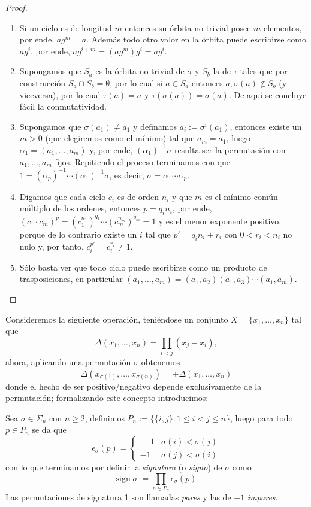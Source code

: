\documentclass[11pt,oneside]{book}
\DeclareMathOperator{\sign}{sign}
\begin{document}
\begin{proof}
	\begin{enumerate}
	\item Si un ciclo es de longitud $m$ entonces su órbita no-trivial posee $m$ elementos, por ende, $ag^m=a$. Además todo otro valor en la órbita puede escribirse como $ag^i$, por ende, $ag^{i+m}=(ag^m)g^i=ag^i$.
	\item Supongamos que $S_a$ es la órbita no trivial de $\sigma$ y $S_b$ la de $\tau$ tales que por construcción $S_a\cap S_b=\emptyset$, por lo cual si $a\in S_a$ entonces $a,\sigma(a)\notin S_b$ (y viceversa), por lo cual $\tau(a)=a$ y $\tau(\sigma(a))=\sigma(a)$. De aquí se concluye fácil la conmutatividad.
	\item Supongamos que $\sigma(a_1)\neq a_1$ y definamos $a_i:=\sigma^i(a_1)$, entonces existe un $m\gt 0$ (que elegiremos como el mínimo) tal que $a_m=a_1$, luego $\alpha_1=(a_1,\dots,a_m)$ y, por ende, $(\alpha_1)^{-1}\sigma$ resulta ser la permutación con $a_1,\dots,a_m$ fijos. Repitiendo el proceso terminamos con que $1=(\alpha_p)^{-1}\cdots(\alpha_1)^{-1}\sigma$, es decir, $\sigma=\alpha_1\cdots\alpha_p$.
	\item Digamos que cada ciclo $c_i$ es de orden $n_i$ y que $m$ es el mínimo común múltiplo de los ordenes, entonces $p=q_in_i$, por ende, $(c_1\cdot c_m)^p=(c_1^{n_1})^{q_1}\cdots(c_m^{n_m})^{q_m}=1$ y es el menor exponente positivo, porque de lo contrario existe un $i$ tal que $p'=q_in_i+r_i$ con $0\lt r_i\lt n_i$ no nulo y, por tanto, $c_i^{p'}=c_i^{r_i}\neq 1$.
	\item Sólo basta ver que todo ciclo puede escribirse como un producto de trasposiciones, en particular $(a_1,\dots,a_m)=(a_1,a_2)(a_1,a_3)\cdots(a_1,a_m)$.
	\end{enumerate}
\end{proof}
Consideremos la siguiente operación, teniéndose un conjunto $X=\{x_1,\dots,x_n\}$ tal que
$$\Delta(x_1,\dots,x_n)=\prod_{i\lt j}(x_j-x_i),$$
ahora, aplicando una permutación $\sigma$ obtenemos
$$\Delta(x_{\sigma(1)},\dots,x_{\sigma(n)})=\pm\Delta(x_1,\dots,x_n)$$
donde el hecho de ser positivo/negativo depende exclusivamente de la permutación; formalizando este concepto introducimos:
\begin{mydef}[Signatura]
Sea $\sigma\in\Sigma_n$ con $n\geq 2$, definimos $P_n:=\{\{i,j\}:1\leq i\lt j\leq n\}$, luego para todo $p\in P_n$ se da que
$$\epsilon_\sigma(p)=\begin{cases}
\phantom{-}1 &\sigma(i)\lt\sigma(j)\\
-1 &\sigma(j)\lt\sigma(i)
\end{cases}$$
con lo que terminamos por definir la \textit{signatura} (o \textit{signo}) de $\sigma$ como
$$\sign\sigma:=\prod_{p\in P_n}\epsilon_\sigma(p).$$ \nomenclature{$\sign\sigma$}{Signatura de la permutación $\sigma$}
Las permutaciones de signatura 1 son llamadas \textit{pares} y las de $-1$ \textit{impares}.
\end{mydef}
\end{document}
